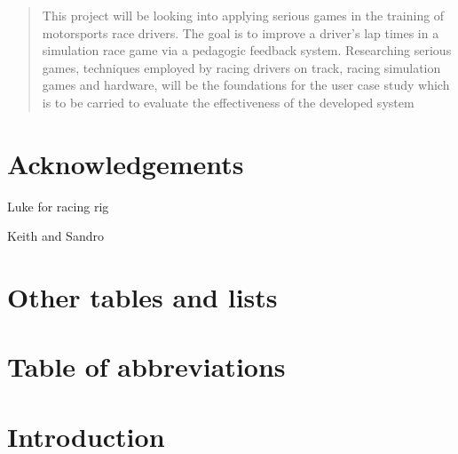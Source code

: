 \documentclass{article}
\begin{document}
\newpage
\begin{abstract}
	

This project will be looking into applying serious games in the training of motorsports race drivers. The goal is to improve a driver's lap times in a simulation race game via a pedagogic feedback system. Researching serious games, techniques employed by racing drivers on track, racing simulation games and hardware, will be the foundations for the user case study which is to be carried to evaluate the effectiveness of the developed system
\end{abstract}

\newpage
\section{Acknowledgements}

Luke for racing rig

Keith and Sandro

\newpage
\tableofcontents

\newpage
\section{Other tables and lists}
\listoffigures

\newpage
\section{Table of abbreviations}

\newpage
\section{Introduction}
\end{document}

